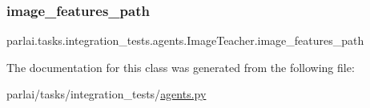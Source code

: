 \subsubsection{\texorpdfstring{image\+\_\+features\+\_\+path}{image\_features\_path}}
{\footnotesize\ttfamily parlai.\+tasks.\+integration\+\_\+tests.\+agents.\+Image\+Teacher.\+image\+\_\+features\+\_\+path}



The documentation for this class was generated from the following file\+:\begin{DoxyCompactItemize}
\item 
parlai/tasks/integration\+\_\+tests/\hyperlink{parlai_2tasks_2integration__tests_2agents_8py}{agents.\+py}\end{DoxyCompactItemize}
